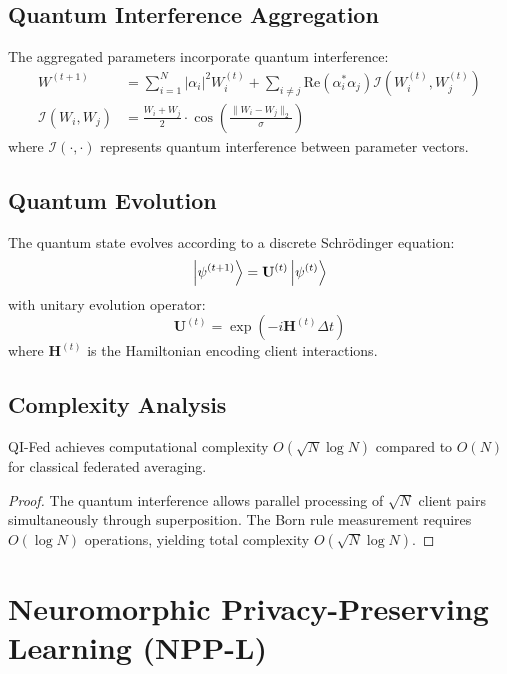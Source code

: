 \documentclass[12pt,a4paper]{article}
\begin{document}
\subsection{Quantum Interference Aggregation}

The aggregated parameters incorporate quantum interference:
\begin{align}
W^{(t+1)} &= \sum_{i=1}^N |\alpha_i|^2 W_i^{(t)} + \sum_{i \neq j} \text{Re}(\alpha_i^* \alpha_j) \mathcal{I}(W_i^{(t)}, W_j^{(t)}) \\
\mathcal{I}(W_i, W_j) &= \frac{W_i + W_j}{2} \cdot \cos\left(\frac{\|W_i - W_j\|_2}{\sigma}\right)
\end{align}
where $\mathcal{I}(\cdot,\cdot)$ represents quantum interference between parameter vectors.

\subsection{Quantum Evolution}

The quantum state evolves according to a discrete Schrödinger equation:
\begin{equation}
\ket{\psi^{(t+1)}} = \mathbf{U}^{(t)} \ket{\psi^{(t)}}
\end{equation}
with unitary evolution operator:
\begin{equation}
\mathbf{U}^{(t)} = \exp\left(-i \mathbf{H}^{(t)} \Delta t\right)
\end{equation}
where $\mathbf{H}^{(t)}$ is the Hamiltonian encoding client interactions.

\subsection{Complexity Analysis}

\begin{theorem}
QI-Fed achieves computational complexity $O(\sqrt{N} \log N)$ compared to $O(N)$ for classical federated averaging.
\end{theorem}

\begin{proof}
The quantum interference allows parallel processing of $\sqrt{N}$ client pairs simultaneously through superposition. The Born rule measurement requires $O(\log N)$ operations, yielding total complexity $O(\sqrt{N} \log N)$.
\end{proof}

\section{Neuromorphic Privacy-Preserving Learning (NPP-L)}
\end{document}
